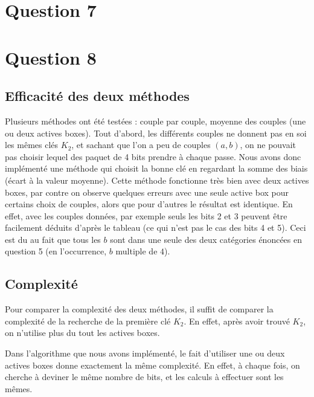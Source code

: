 \section*{Question 7}


\section*{Question 8}

\subsection*{Efficacité des deux méthodes}

Plusieurs méthodes ont été testées : couple par couple, moyenne des couples (une ou deux actives boxes). Tout d'abord, les différents couples ne donnent pas en soi les mêmes clés $K_2$, et sachant que l'on a peu de couples $(a,b)$, on ne pouvait pas choisir lequel des paquet de 4 bits prendre à chaque passe. Nous avons donc implémenté une méthode qui choisit la bonne clé en regardant la somme des biais (écart à la valeur moyenne). Cette méthode fonctionne très bien avec deux actives boxes, par contre on observe quelques erreurs avec une seule active box pour certains choix de couples, alors que pour d'autres le résultat est identique. En effet, avec les couples données, par exemple seuls les bits 2 et 3 peuvent être facilement déduits d'après le tableau (ce qui n'est pas le cas des bits 4 et 5). Ceci est du au fait que tous les $b$ sont dans une seule des deux catégories énoncées en question 5 (en l'occurrence, $b$ multiple de $4$).

\subsection*{Complexité}


Pour comparer la complexité des deux méthodes, il suffit de comparer la complexité de la recherche de la première clé $K_2$. En effet, après avoir trouvé $K_2$, on n'utilise plus du tout les actives boxes.

Dans l'algorithme que nous avons implémenté, le fait d'utiliser une ou deux actives boxes donne exactement la même complexité. En effet, à chaque fois, on cherche à deviner le même nombre de bits, et les calculs à effectuer sont les mêmes.

